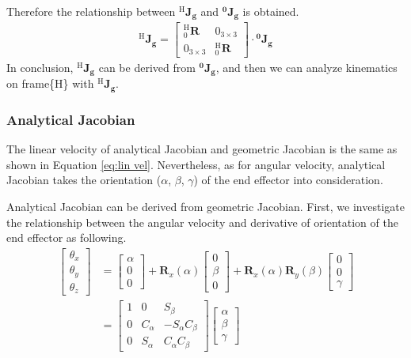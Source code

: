 Therefore the relationship between $\mathbf{^\mathrm{H}\!J_g}$ and $\mathbf{^0\!J_g}$ is obtained.
\begin{equation}
\begin{split}
\mathbf{^\mathrm{H}\!J_g}
= 
\begin{bmatrix}
^{\mathrm{H}}_0\mathbf{R} & 0_{ 3\times 3} \\ 
0_{ 3\times 3} & ^{\mathrm{H}}_0\mathbf{R}
\end{bmatrix}
\cdot
\mathbf{^0\!J_g}
\end{split}
\end{equation}
In conclusion, $^{\mathrm{H}}\!\mathbf{J_g}$ can be derived from $\mathbf{^0\!J_g}$, and then we can analyze kinematics on frame\{H\} with $^{\mathrm{H}}\!\mathbf{J_g}$.
\subsubsection{Analytical Jacobian}
\hspace*{6mm}The linear velocity of analytical Jacobian and geometric Jacobian is the same as shown in Equation \ref{eq:lin vel}. Nevertheless, as for angular velocity, analytical Jacobian takes the orientation ($\alpha$, $\beta$, $\gamma$) of the end effector into consideration. 
\par
Analytical Jacobian can be derived from geometric Jacobian. First, we investigate the relationship between the angular velocity and derivative of orientation of the end effector as following.
\begin{equation}
\label{eq: Jwe}
\begin{split}
\begin{bmatrix}
\theta _x \\ 
\theta _y \\ 
\theta _z
\end{bmatrix}
&=
\begin{bmatrix}
\alpha \\ 
0\\ 
0
\end{bmatrix}
+
\mathbf{R}_x(\alpha )
\begin{bmatrix}
0 \\ 
\beta \\ 
0
\end{bmatrix}
+
\mathbf{R}_x(\alpha )\mathbf{R}_y(\beta )
\begin{bmatrix}
0 \\ 
0\\ 
\gamma
\end{bmatrix}\\
&=
\begin{bmatrix}
1 & 0 & S_\beta \\ 
0 & C_\alpha & -S_\alpha C_\beta \\ 
0 & S_\alpha & C_\alpha C_\beta
\end{bmatrix}
\begin{bmatrix}
\alpha \\ 
\beta\\ 
\gamma
\end{bmatrix}
\end{split}
\end{equation}
